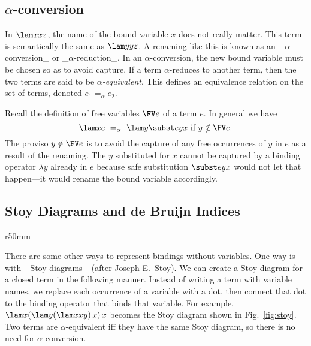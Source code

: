 \subsection{$\alpha$-conversion}

In $\lam x{xz}$, the name of the bound variable $x$ does not really matter.
This term is semantically the same as $\lam y{yz}$.
A renaming like this is known as an _$\alpha$-conversion_ or _$\alpha$-reduction_.
In an $\alpha$-conversion, the new bound variable must be chosen so as to avoid capture.
If a term $\alpha$-reduces to another term, then the two terms are said to be \emph{$\alpha$-equivalent}.
This defines an equivalence relation on the set of terms, denoted $e_1 =_\alpha e_2$.

Recall the definition of free variables $\FV e$ of a term $e$. In general we have
\[
\lam xe\ =_\alpha\ \lam y{\subst eyx} \text{ if } y\notin \FV e.
\]
The proviso $y\notin\FV e$ is to avoid the capture of any free occurrences of $y$ in $e$ as a result of the renaming.
The $y$ substituted for $x$ cannot be captured by a binding operator $\lambda y$ already in $e$ because safe substitution $\subst eyx$ would not let that happen---it would rename the bound variable accordingly.

\subsection{Stoy Diagrams and de Bruijn Indices}

\begin{wrapfigure}[6]{r}{50mm}
 \caption{A Stoy diagram}
 \label{fig:stoy}
\end{wrapfigure}
There are some other ways to represent bindings without variables. One way is with _Stoy diagrams_ (after Joseph E.~Stoy).
We can create a Stoy diagram for a closed term in the following manner.
Instead of writing a term with variable names, we replace each occurrence of a variable with
a dot, then connect that dot to the binding operator that binds that variable.
For example, $\lam x{(\lam y{(\lam x{xy})\,x})\,x}$ becomes the
Stoy diagram shown in Fig.~\ref{fig:stoy}. Two terms are
$\alpha$-equivalent iff they have the same Stoy diagram, so there is no need for $\alpha$-conversion.

